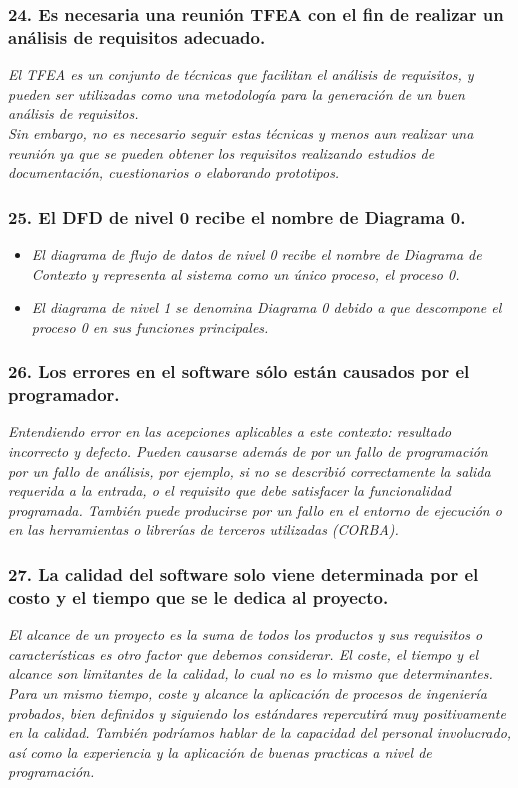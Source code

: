 \subsubsection*{24. Es necesaria una reunión TFEA con el fin de realizar un análisis de requisitos adecuado.}
\textit{El TFEA es un conjunto de técnicas que facilitan el análisis de requisitos, y pueden ser utilizadas como una metodología para la generación de un buen análisis de requisitos.
\\
Sin embargo, no es necesario seguir estas técnicas y menos aun realizar una reunión ya que se pueden obtener los requisitos realizando estudios de documentación, cuestionarios o elaborando prototipos.}

\subsubsection*{25. El DFD de nivel 0 recibe el nombre de Diagrama 0.}
\begin{itemize}
    \item \textit{El diagrama de flujo de datos de \emph{nivel 0} recibe el nombre de \emph{Diagrama de Contexto} y representa al sistema como un único proceso, el proceso 0.}
    \item \textit{El \emph{diagrama de nivel 1 se denomina Diagrama 0} debido a que \emph{descompone el proceso 0} en sus funciones principales.}

\end{itemize}

\subsubsection*{26. Los errores en el software sólo están causados por el programador.}
\textit{Entendiendo error en las acepciones aplicables a este contexto: resultado incorrecto y defecto. Pueden causarse además de por un fallo de programación por un fallo de análisis, por ejemplo, si no se describió correctamente la salida requerida a la entrada, o el requisito que debe satisfacer la funcionalidad programada. También puede producirse por un fallo en el entorno de ejecución o en las herramientas o librerías de terceros utilizadas (CORBA).}

\subsubsection*{27. La calidad del software solo viene determinada por el costo y el tiempo que se le dedica al proyecto.} %
\textit{El alcance de un proyecto es la suma de todos los productos y sus requisitos o características es otro factor que debemos considerar.
El coste, el tiempo y el alcance son limitantes de la calidad, lo cual no es lo mismo que determinantes.\\
Para un mismo tiempo, coste y alcance la aplicación de procesos de ingeniería probados, bien definidos y siguiendo los estándares repercutirá muy positivamente en la calidad. También podríamos hablar de la capacidad del personal involucrado, así como la experiencia y la aplicación de buenas practicas a nivel de programación.
}

